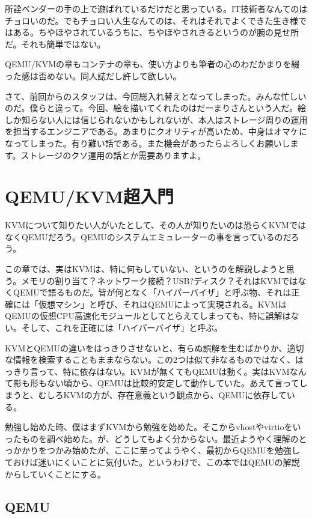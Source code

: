 ﻿\documentclass[9pt,b5paper,tombo,openany]{jsbook}
\begin{document}
所詮ベンダーの手の上で遊ばれているだけだと思っている。IT技術者なんてのはチョロいのだ。でもチョロい人生なんてのは、それはそれでよくできた生き様ではある。ちやほやされているうちに、ちやほやされきるというのが腕の見せ所だ。それも簡単ではない。

QEMU/KVMの章もコンテナの章も、使い方よりも筆者の心のわだかまりを綴った感は否めない。同人誌だし許して欲しい。

さて、前回からのスタッフは、今回総入れ替えとなってしまった。みんな忙しいのだ。僕らと違って。今回、絵を描いてくれたのはだーまりさんという人だ。絵しか知らない人には信じられないかもしれないが、本人はストレージ周りの運用を担当するエンジニアである。あまりにクオリティが高いため、中身はオマケになってしまった。有り難い話である。また機会があったらよろしくお願いします。ストレージのクソ運用の話とか需要ありますよ。

\chapter{QEMU/KVM超入門}

KVMについて知りたい人がいたとして、その人が知りたいのは恐らくKVMではなくQEMUだろう。QEMUのシステムエミュレーターの事を言っているのだろう。

この章では、実はKVMは、特に何もしていない、というのを解説しようと思う。メモリの割り当て？ネットワーク接続？USB?ディスク？それはKVMではなくQEMUで語るものだ。皆が何となく「ハイパーバイザ」と呼ぶ物、それは正確には「仮想マシン」と呼び、それはQEMUによって実現される。KVMはQEMUの仮想CPU高速化モジュールとしてとらえてしまっても、特に誤解はない。そして、これを正確には「ハイパーバイザ」と呼ぶ。

KVMとQEMUの違いをはっきりさせないと、有らぬ誤解を生むばかりか、適切な情報を検索することもままならない。この2つは似て非なるものではなく、はっきり言って、特に依存はない。KVMが無くてもQEMUは動く。実はKVMなんて影も形もない頃から、QEMUは比較的安定して動作していた。あえて言ってしまうと、むしろKVMの方が、存在意義という観点から、QEMUに依存している。

勉強し始めた時、僕はまずKVMから勉強を始めた。そこからvhostやvirtioをいったものを調べ始めた。が、どうしてもよく分からない。最近ようやく理解のとっかかりをつかみ始めたが、ここに至ってようやく、最初からQEMUを勉強しておけば迷いにくいことに気付いた。というわけで、この本ではQEMUの解説からしていくことにする。

\section{QEMU}
\end{document}
